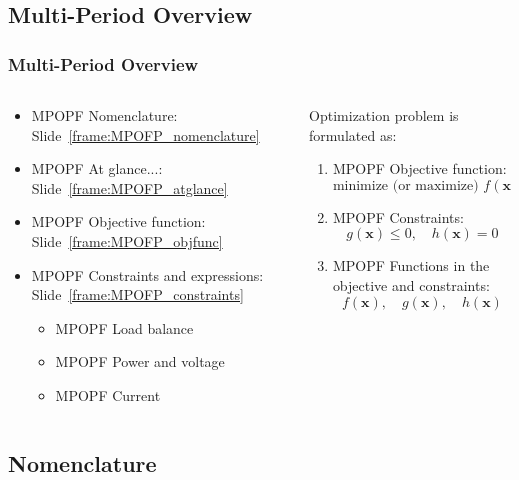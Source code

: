 \documentclass[
	11pt, %
	aspectratio=169, %
]{beamer}
\begin{document}

\subsection{Multi-Period Overview}

\begin{frame}
	\frametitle{Multi-Period Overview}
	
	\begin{columns}
		\begin{column}{0.5\textwidth}
			\begin{itemize}
				\item MPOPF Nomenclature: Slide~\ref{frame:MPOFP_nomenclature}
				\item MPOPF At glance...: Slide~\ref{frame:MPOFP_atglance}
				\item MPOPF Objective function: Slide~\ref{frame:MPOFP_objfunc}
				\item MPOPF Constraints and expressions: Slide~\ref{frame:MPOFP_constraints}
					\begin{itemize}
						\item MPOPF Load balance
						\item MPOPF Power and voltage
						\item MPOPF Current
					\end{itemize}
			\end{itemize}
		\end{column}

		\begin{column}{0.5\textwidth}
			Optimization problem is formulated as:
			\begin{enumerate}
				\item MPOPF Objective function:
				\[
					\text{minimize (or maximize) } f(\mathbf{x})
				\]
				\item MPOPF Constraints:
				\[
					g(\mathbf{x}) \leq 0, \quad h(\mathbf{x}) = 0
				\]
				\item MPOPF Functions in the objective and constraints:
				\[
					f(\mathbf{x}), \quad g(\mathbf{x}), \quad h(\mathbf{x})
				\]
			\end{enumerate}
		\end{column}
	\end{columns}
\end{frame}


\subsection{Nomenclature}
\end{document}
